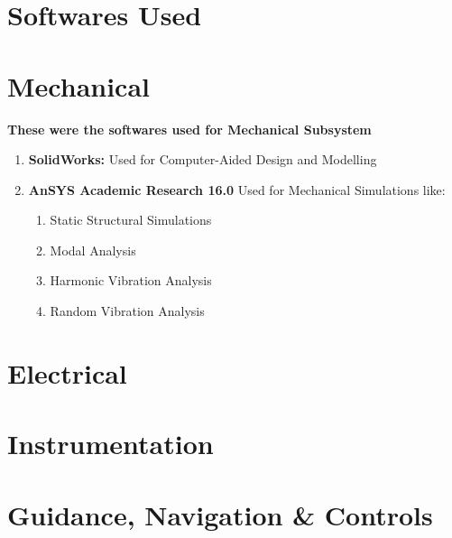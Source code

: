 \documentclass[../../main.tex]{subfiles}
\begin{document}
\section{Softwares Used}
\thispagestyle{fancy}

\section*{Mechanical}
\textbf{These were the softwares used for Mechanical Subsystem}
\begin{enumerate}
    \item \textbf{SolidWorks:} Used for Computer-Aided Design and Modelling
    \item \textbf{AnSYS Academic Research 16.0 } Used for Mechanical Simulations like:
    \begin{enumerate}
        \item Static Structural Simulations
        \item Modal Analysis
        \item Harmonic Vibration Analysis
        \item Random Vibration Analysis
    \end{enumerate}

\end{enumerate}

\section*{Electrical}
\blindtext

\section*{Instrumentation}
\blindtext

\section*{Guidance, Navigation \& Controls}
\blindtext
\end{document}
